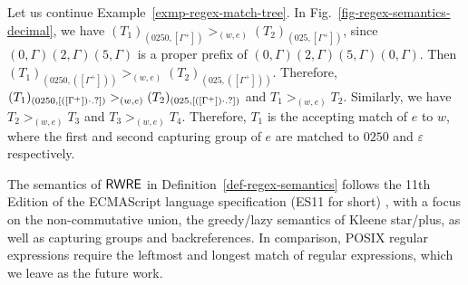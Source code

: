 \begin{example}\label{exmp-regex-semantics}
Let us continue Example~\ref{exmp-regex-match-tree}.  In Fig.~\ref{fig-regex-semantics-decimal}, we have $(T_1)_{(0250, [\Gamma^+])} >_{(w, e)} (T_2)_{(025, [\Gamma^+])}$, since $(0, \Gamma)(2, \Gamma)(5,\Gamma)$ is a proper prefix of $(0, \Gamma)(2, \Gamma)(5,\Gamma)(0, \Gamma)$. Then $(T_1)_{(0250, ([\Gamma^+]))} >_{(w, e)} (T_2)_{(025, ([\Gamma^+]))}$. Therefore, $(T_1)_{(0250, [([\Gamma^+]) \cdot .?])} >_{(w, e)} (T_2)_{(025,  [([\Gamma^+]) \cdot .?])}$ and $T_1 >_{(w,e)} T_2$. Similarly, we have $T_2 >_{(w,e)} T_3$ and $T_3 >_{(w,e)} T_4$. Therefore, $T_1$ is the accepting match of $e$ to $w$, where the first and second capturing group of $e$ are matched to $0250$  and $\varepsilon$ respectively. 
 \end{example}
  
\begin{remark}
The semantics of ${\sf RWRE}$ in Definition~\ref{def-regex-semantics} follows the 11th Edition of the ECMAScript language specification (ES11 for short) \cite{ECMAScript11}, with a focus on the non-commutative union, the greedy/lazy semantics of Kleene star/plus, as well as capturing groups and backreferences.
In comparison, POSIX regular expressions require the leftmost and longest match of regular expressions, which we leave as the future work. 
\end{remark}
  
  
  
%  
